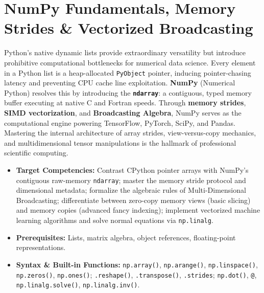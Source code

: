 \chapter{NumPy Fundamentals, Memory Strides \& Vectorized Broadcasting}

Python's native dynamic lists provide extraordinary versatility but introduce prohibitive computational bottlenecks for numerical data science. Every element in a Python list is a heap-allocated \texttt{PyObject} pointer, inducing pointer-chasing latency and preventing CPU cache line exploitation. \textbf{NumPy} (Numerical Python) resolves this by introducing the \textbf{\texttt{ndarray}}: a contiguous, typed memory buffer executing at native C and Fortran speeds. Through \textbf{memory strides}, \textbf{SIMD vectorization}, and \textbf{Broadcasting Algebra}, NumPy serves as the computational engine powering TensorFlow, PyTorch, SciPy, and Pandas. Mastering the internal architecture of array strides, view-versus-copy mechanics, and multidimensional tensor manipulations is the hallmark of professional scientific computing.

\vspace{0.5cm}
\begin{tcolorbox}[colback=primarylight, colframe=primarydark, title={\textbf{Executive Roadmap \& Learning Objectives}}]
\begin{itemize}
    \item \textbf{Target Competencies:} Contrast CPython pointer arrays with NumPy's contiguous raw-memory \texttt{ndarray}; master the memory stride protocol and dimensional metadata; formalize the algebraic rules of Multi-Dimensional Broadcasting; differentiate between zero-copy memory views (basic slicing) and memory copies (advanced fancy indexing); implement vectorized machine learning algorithms and solve normal equations via \texttt{np.linalg}.
    \item \textbf{Prerequisites:} Lists, matrix algebra, object references, floating-point representations.
    \item \textbf{Syntax \& Built-in Functions:} \texttt{np.array()}, \texttt{np.arange()}, \texttt{np.linspace()}, \texttt{np.zeros()}, \texttt{np.ones()}; \texttt{.reshape()}, \texttt{.transpose()}, \texttt{.strides}; \texttt{np.dot()}, \texttt{@}, \texttt{np.linalg.solve()}, \texttt{np.linalg.inv()}.
\end{itemize}
\end{tcolorbox}

